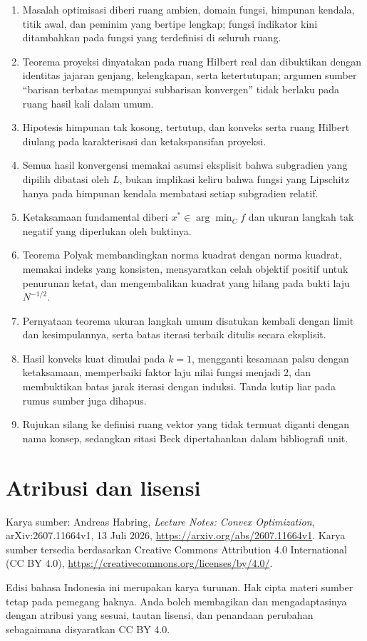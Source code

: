 \documentclass[indonesian]{shinybook}
\begin{document}
\begin{enumerate}
    \item Masalah optimisasi diberi ruang ambien, domain fungsi, himpunan kendala, titik awal, dan peminim yang bertipe lengkap; fungsi indikator kini ditambahkan pada fungsi yang terdefinisi di seluruh ruang.
    \item Teorema proyeksi dinyatakan pada ruang Hilbert real dan dibuktikan dengan identitas jajaran genjang, kelengkapan, serta ketertutupan; argumen sumber ``barisan terbatas mempunyai subbarisan konvergen'' tidak berlaku pada ruang hasil kali dalam umum.
    \item Hipotesis himpunan tak kosong, tertutup, dan konveks serta ruang Hilbert diulang pada karakterisasi dan ketakspansifan proyeksi.
    \item Semua hasil konvergensi memakai asumsi eksplisit bahwa subgradien yang dipilih dibatasi oleh \(L\), bukan implikasi keliru bahwa fungsi yang Lipschitz hanya pada himpunan kendala membatasi setiap subgradien relatif.
    \item Ketaksamaan fundamental diberi \(x^*\in\arg\min_C f\) dan ukuran langkah tak negatif yang diperlukan oleh buktinya.
    \item Teorema Polyak membandingkan norma kuadrat dengan norma kuadrat, memakai indeks yang konsisten, mensyaratkan celah objektif positif untuk penurunan ketat, dan mengembalikan kuadrat yang hilang pada bukti laju \(N^{-1/2}\).
    \item Pernyataan teorema ukuran langkah umum disatukan kembali dengan limit dan kesimpulannya, serta batas iterasi terbaik ditulis secara eksplisit.
    \item Hasil konveks kuat dimulai pada \(k=1\), mengganti kesamaan palsu dengan ketaksamaan, memperbaiki faktor laju nilai fungsi menjadi \(2\), dan membuktikan batas jarak iterasi dengan induksi. Tanda kutip liar pada rumus sumber juga dihapus.
    \item Rujukan silang ke definisi ruang vektor yang tidak termuat diganti dengan nama konsep, sedangkan sitasi Beck dipertahankan dalam bibliografi unit.
\end{enumerate}

\printbibliography

\chapter*{Atribusi dan lisensi}
Karya sumber: Andreas Habring, \emph{Lecture Notes: Convex Optimization}, arXiv:2607.11664v1, 13 Juli 2026, \url{https://arxiv.org/abs/2607.11664v1}. Karya sumber tersedia berdasarkan Creative Commons Attribution 4.0 International (CC BY 4.0), \url{https://creativecommons.org/licenses/by/4.0/}.

Edisi bahasa Indonesia ini merupakan karya turunan. Hak cipta materi sumber tetap pada pemegang haknya. Anda boleh membagikan dan mengadaptasinya dengan atribusi yang sesuai, tautan lisensi, dan penandaan perubahan sebagaimana disyaratkan CC BY 4.0.
\end{document}

